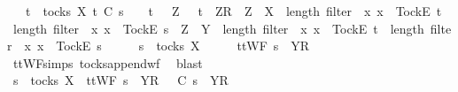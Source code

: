 \ \ {\isacharparenleft}{\isasymexists}\ t\ {\isasymin}\ tocks\ X{\isachardot}\ t\ {\isasymlesssim}\isactrlsub C\ s\ {\isasymand}\ {\isacharparenleft}{\isasymrho}\ {\isacharequal}\ t\ {\isasymor}\ {\isacharparenleft}{\isasymexists}\ Z{\isachardot}\ {\isasymrho}\ {\isacharequal}\ t\ {\isacharat}\ {\isacharbrackleft}{\isacharbrackleft}Z{\isacharbrackright}\isactrlsub R{\isacharbrackright}\ {\isasymand}\ {\isacharparenleft}{\isacharparenleft}Z\ {\isasymsubseteq}\ X\ {\isasymand}\ length\ {\isacharparenleft}filter\ {\isacharparenleft}{\isasymlambda}\ x{\isachardot}\ x\ {\isacharequal}\ {\isacharbrackleft}Tock{\isacharbrackright}\isactrlsub E{\isacharparenright}\ t{\isacharparenright}\ {\isacharless}\ length\ {\isacharparenleft}filter\ {\isacharparenleft}{\isasymlambda}\ x{\isachardot}\ x\ {\isacharequal}\ {\isacharbrackleft}Tock{\isacharbrackright}\isactrlsub E{\isacharparenright}\ s{\isacharparenright}{\isacharparenright}\ {\isasymor}\ {\isacharparenleft}Z\ {\isasymsubseteq}\ Y\ {\isasymand}\ length\ {\isacharparenleft}filter\ {\isacharparenleft}{\isasymlambda}\ x{\isachardot}\ x\ {\isacharequal}\ {\isacharbrackleft}Tock{\isacharbrackright}\isactrlsub E{\isacharparenright}\ t{\isacharparenright}\ {\isacharequal}\ length\ {\isacharparenleft}filter\ {\isacharparenleft}{\isasymlambda}\ x{\isachardot}\ x\ {\isacharequal}\ {\isacharbrackleft}Tock{\isacharbrackright}\isactrlsub E{\isacharparenright}\ s{\isacharparenright}{\isacharparenright}{\isacharparenright}{\isacharparenright}{\isacharparenright}{\isacharparenright}{\isachardoublequoteclose}\isanewline
%
\isadelimproof
%
\endisadelimproof
%
\isatagproof
{}\isamarkupfalse%
\ {\isacharminus}\isanewline
\ \ \isamarkupfalse%
\ {\isachardoublequoteopen}s\ {\isasymin}\ tocks\ X{\isachardoublequoteclose}\isanewline
\ \ \isamarkupfalse%
\ \isamarkupfalse%
\ {\isachardoublequoteopen}ttWF\ {\isacharparenleft}s\ {\isacharat}\ {\isacharbrackleft}{\isacharbrackleft}Y{\isacharbrackright}\isactrlsub R{\isacharbrackright}{\isacharparenright}{\isachardoublequoteclose}\isanewline
\ \ \ \ \isamarkupfalse%
\ ttWF{\isachardot}simps{\isacharparenleft}{}{\isacharparenright}\ tocks{\isacharunderscore}append{\isacharunderscore}wf\ \isamarkupfalse%
\ blast\isanewline
\ \ \isamarkupfalse%
\ \isamarkupfalse%
\ {\isachardoublequoteopen}s\ {\isasymin}\ tocks\ X\ {\isasymlongrightarrow}\ ttWF\ {\isacharparenleft}s\ {\isacharat}\ {\isacharbrackleft}{\isacharbrackleft}Y{\isacharbrackright}\isactrlsub R{\isacharbrackright}{\isacharparenright}\ {\isasymlongrightarrow}\ {\isasymrho}\ {\isasymlesssim}\isactrlsub C\ s\ {\isacharat}\ {\isacharbrackleft}{\isacharbrackleft}Y{\isacharbrackright}\isactrlsub R{\isacharbrackright}\ {\isasymlongrightarrow}\ \isanewline
